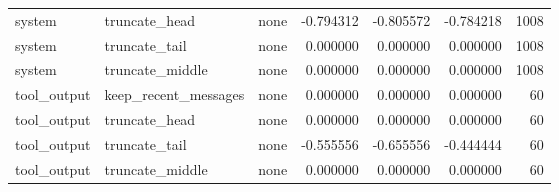 \begin{tabular}{lllrrrr}
system & truncate_head & none & -0.794312 & -0.805572 & -0.784218 & 1008 \\
system & truncate_tail & none & 0.000000 & 0.000000 & 0.000000 & 1008 \\
system & truncate_middle & none & 0.000000 & 0.000000 & 0.000000 & 1008 \\
tool_output & keep_recent_messages & none & 0.000000 & 0.000000 & 0.000000 & 60 \\
tool_output & truncate_head & none & 0.000000 & 0.000000 & 0.000000 & 60 \\
tool_output & truncate_tail & none & -0.555556 & -0.655556 & -0.444444 & 60 \\
tool_output & truncate_middle & none & 0.000000 & 0.000000 & 0.000000 & 60 \\
\bottomrule
\end{tabular}
